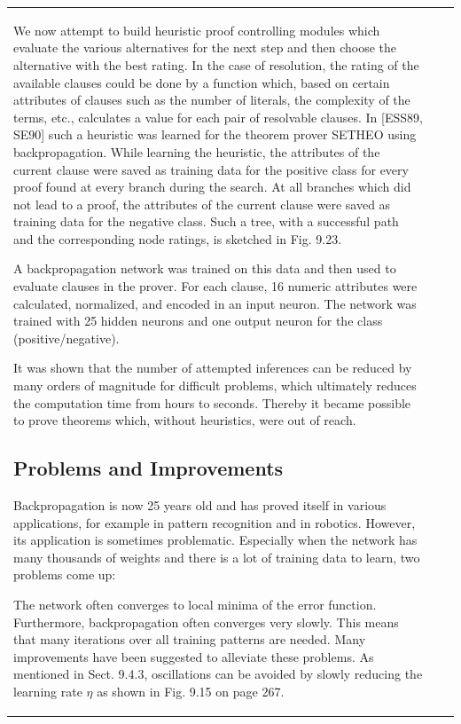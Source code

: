 \documentclass[10pt]{book}
\begin{document}
\begin{center}
\begin{tabular}{|l|l|l|}
We now attempt to build heuristic proof controlling modules which evaluate the various alternatives for the next step and then choose the alternative with the best rating. In the case of resolution, the rating of the available clauses could be done by a function which, based on certain attributes of clauses such as the number of literals, the complexity of the terms, etc., calculates a value for each pair of resolvable clauses. In [ESS89, SE90] such a heuristic was learned for the theorem prover SETHEO using backpropagation. While learning the heuristic, the attributes of the current clause were saved as training data for the positive class for every proof found at every branch during the search. At all branches which did not lead to a proof, the attributes of the current clause were saved as training data for the negative class. Such a tree, with a successful path and the corresponding node ratings, is sketched in Fig. 9.23.

A backpropagation network was trained on this data and then used to evaluate clauses in the prover. For each clause, 16 numeric attributes were calculated, normalized, and encoded in an input neuron. The network was trained with 25 hidden neurons and one output neuron for the class (positive/negative).

It was shown that the number of attempted inferences can be reduced by many orders of magnitude for difficult problems, which ultimately reduces the computation time from hours to seconds. Thereby it became possible to prove theorems which, without heuristics, were out of reach.

\subsection{Problems and Improvements}
Backpropagation is now 25 years old and has proved itself in various applications, for example in pattern recognition and in robotics. However, its application is sometimes problematic. Especially when the network has many thousands of weights and there is a lot of training data to learn, two problems come up:

The network often converges to local minima of the error function. Furthermore, backpropagation often converges very slowly. This means that many iterations over all training patterns are needed. Many improvements have been suggested to alleviate these problems. As mentioned in Sect. 9.4.3, oscillations can be avoided by slowly reducing the learning rate $\eta$ as shown in Fig. 9.15 on page 267.


\end{tabular}
\end{center}
\end{document}
